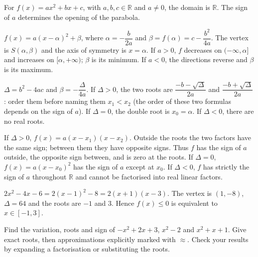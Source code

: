 \documentclass[11pt]{article}
\begin{document}
For $f(x)=ax^2+bx+c$, with $a,b,c\in\mathbb R$ and $a\ne0$, the domain is $\mathbb R$. The sign of $a$ determines the opening of the parabola.\par
{}
$f(x)=a(x-\alpha)^2+\beta$, where $\alpha=-\dfrac{b}{2a}$ and $\beta=f(\alpha)=c-\dfrac{b^2}{4a}$. The vertex is $S(\alpha,\beta)$ and the axis of symmetry is $x=\alpha$. If $a>0$, $f$ decreases on $(-\infty,\alpha]$ and increases on $[\alpha,+\infty)$; $\beta$ is its minimum. If $a<0$, the directions reverse and $\beta$ is its maximum.\par
{}
$\Delta=b^2-4ac$ and $\beta=-\dfrac{\Delta}{4a}$. If $\Delta>0$, the two roots are $\dfrac{-b-\sqrt\Delta}{2a}$ and $\dfrac{-b+\sqrt\Delta}{2a}$: order them before naming them $x_1<x_2$ (the order of these two formulas depends on the sign of $a$). If $\Delta=0$, the double root is $x_0=\alpha$. If $\Delta<0$, there are no real roots.\par
{}
If $\Delta>0$, $f(x)=a(x-x_1)(x-x_2)$. Outside the roots the two factors have the same sign; between them they have opposite signs. Thus $f$ has the sign of $a$ outside, the opposite sign between, and is zero at the roots. If $\Delta=0$, $f(x)=a(x-x_0)^2$ has the sign of $a$ except at $x_0$. If $\Delta<0$, $f$ has strictly the sign of $a$ throughout $\mathbb R$ and cannot be factorised into real linear factors.\par
{}
$2x^2-4x-6=2(x-1)^2-8=2(x+1)(x-3)$. The vertex is $(1,-8)$, $\Delta=64$ and the roots are $-1$ and $3$. Hence $f(x)\le0$ is equivalent to $x\in[-1,3]$.\par
\begin{center}\end{center}
Find the variation, roots and sign of $-x^2+2x+3$, $x^2-2$ and $x^2+x+1$. Give exact roots, then approximations explicitly marked with $\approx$. Check your results by expanding a factorisation or substituting the roots.\par
\end{document}
